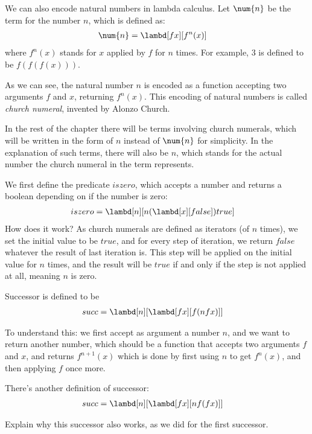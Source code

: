 \documentclass[../../../include/open-logic-section]{subfiles}
\begin{document}

We can also encode natural numbers in lambda calculus. Let
$\num{n}$ be the term for the number $n$, which is defined as:
\begin{align*}
  \num{n} &= \lambd[fx][f^n(x)]
\end{align*}
where $f^n(x)$ stands for $x$ applied by $f$ for $n$ times. For
example, $\num{3}$ is defined to be $f(f(f(x)))$. 

As we can see, the natural number $n$ is encoded as a function
accepting two arguments $f$ and $x$, returning $f^n(x)$. This encoding
of natural numbers is called \emph{church numeral}, invented by Alonzo
Church.

In the rest of the chapter there will be terms involving church
numerals, which will be written in the form of $n$ instead of
$\num{n}$ for simplicity. In the explanation of such terms, there will
also be $n$, which stands for the actual number the church numeral in
the term represents.


We first define the predicate $iszero$, which accepts a number and
returns a boolean depending on if the number is zero:
\begin{align*}
  iszero &= \lambd[n][n (\lambd[x][false]) true]
\end{align*}
How does it work? As church numerals are defined as iterators (of $n$
times), we set the initial value to be $true$, and for every step of
iteration, we return $false$ whatever the result of last iteration is.
This step will be applied on the initial value for $n$ times, and the
result will be $true$ if and only if the step is not applied at all,
meaning $n$ is zero.

Successor is defined to be
\begin{align*}
  {succ} &= \lambd[{n}][\lambd[fx][f ({n} f x)]]
\end{align*}

To understand this: we first accept as argument a number ${n}$, and we want to return another number,
which should be a function that accepts
two arguments $f$ and $x$, and returns $f^{n+1}(x)$
which is done by first using ${n}$ to get $f^n(x)$, and then applying $f$ once more.

There's another definition of successor:
\begin{align*}
  {succ} &= \lambd[{n}][\lambd[fx][{n} f (f x)]]
\end{align*}

\begin{prob}
  Explain why this successor also works, as we did for the first successor.
\end{prob}
\end{document}
